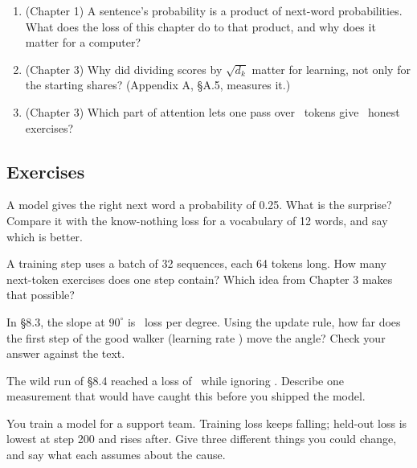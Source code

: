 \begin{lookingback}
\begin{enumerate}[label=(\arabic*),leftmargin=1.6em]
\item (Chapter 1) A sentence's probability is a product of next-word probabilities. What does the loss of
this chapter do to that product, and why does it matter for a computer?
\item (Chapter 3) Why did dividing scores by $\sqrt{d_k}$ matter for learning, not only for the starting
shares? (Appendix A, \S A.5, measures it.)
\item (Chapter 3) Which part of attention lets one pass over \nEightSeqLen\ tokens give \nEightNumEx\ honest
exercises?
\end{enumerate}
\end{lookingback}

\subsection*{Exercises}

\begin{exercise}
A model gives the right next word a probability of 0.25. What is the surprise? Compare it with the
know-nothing loss for a vocabulary of 12 words, and say which is better.
\end{exercise}

\begin{exercise}
A training step uses a batch of 32 sequences, each 64 tokens long. How many next-token exercises does one
step contain? Which idea from Chapter 3 makes that possible?
\end{exercise}

\begin{exercise}
In \S8.3, the slope at $90^\circ$ is \nEightSlopeNinety\ loss per degree. Using the update rule, how far does
the first step of the good walker (learning rate \nEightLrGood) move the angle? Check your answer against the
text.
\end{exercise}

\begin{exercise}
The wild run of \S8.4 reached a loss of \nEightTrainWildLossEnd\ while ignoring . Describe one
measurement that would have caught this before you shipped the model.
\end{exercise}

\begin{exercise}
You train a model for a support team. Training loss keeps falling; held-out loss is lowest at step 200 and
rises after. Give three different things you could change, and say what each assumes about the cause.
\end{exercise}

